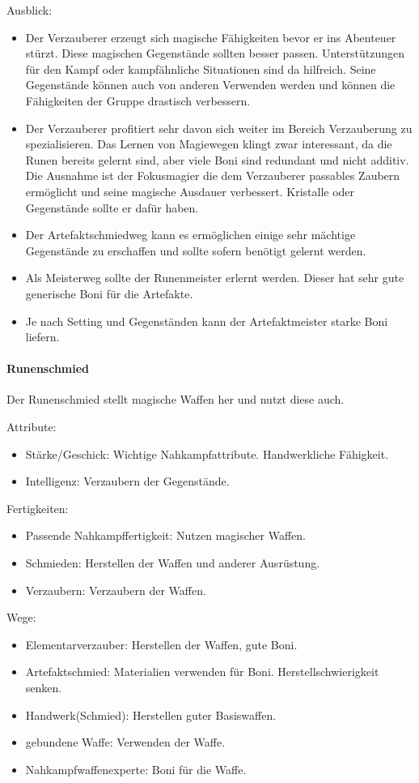 \documentclass{article}
\begin{document}
Ausblick:
\begin{itemize}
\item Der Verzauberer erzeugt sich magische Fähigkeiten bevor er ins Abenteuer stürzt. Diese magischen Gegenstände sollten besser passen. Unterstützungen für den Kampf oder kampfähnliche Situationen sind da hilfreich. Seine Gegenstände können auch von anderen Verwenden werden und können die Fähigkeiten der Gruppe drastisch verbessern.
\item Der Verzauberer profitiert sehr davon sich weiter im Bereich Verzauberung zu spezialisieren. Das Lernen von Magiewegen klingt zwar interessant, da die Runen bereits gelernt sind, aber viele Boni sind redundant und nicht additiv. Die Ausnahme ist der Fokusmagier die dem Verzauberer passables Zaubern ermöglicht und seine magische Ausdauer verbessert. Kristalle oder Gegenstände sollte er dafür haben.
\item Der Artefaktschmiedweg kann es ermöglichen einige sehr mächtige Gegenstände zu erschaffen und sollte sofern benötigt gelernt werden.
\item Als Meisterweg sollte der Runenmeister erlernt werden. Dieser hat sehr gute generische Boni für die Artefakte.
\item Je nach Setting und Gegenständen kann der Artefaktmeister starke Boni liefern.
\end{itemize}

\paragraph{Runenschmied}
Der Runenschmied stellt magische Waffen her und nutzt diese auch.

Attribute:
\begin{itemize}
\item Stärke/Geschick: Wichtige Nahkampfattribute. Handwerkliche Fähigkeit.
\item Intelligenz: Verzaubern der Gegenstände.
\end{itemize}

Fertigkeiten:
\begin{itemize}
\item Passende Nahkampffertigkeit: Nutzen magischer Waffen.
\item Schmieden: Herstellen der Waffen und anderer Ausrüstung.
\item Verzaubern: Verzaubern der Waffen.
\end{itemize}

Wege:
\begin{itemize}
\item Elementarverzauber: Herstellen der Waffen, gute Boni.
\item Artefaktschmied: Materialien verwenden für Boni. Herstellschwierigkeit senken.
\item Handwerk(Schmied): Herstellen guter Basiswaffen.
\item gebundene Waffe: Verwenden der Waffe.
\item Nahkampfwaffenexperte: Boni für die Waffe.
\end{itemize}
\end{document}
